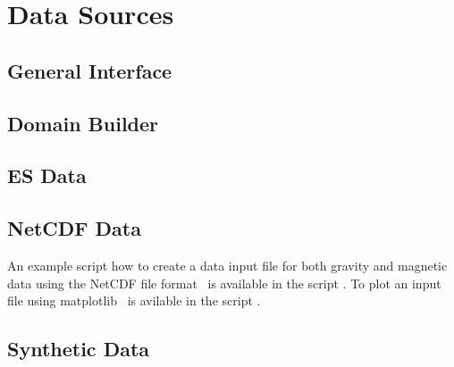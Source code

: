 \chapter{Data Sources}\label{Chp:ref:data sources}

\section{General Interface}

\section{Domain Builder}

\section{ES Data}

\section{NetCDF Data}
An example script how to create a data input file for both gravity and magnetic data using the NetCDF file format~\cite{NETCDF}
is available in the script . To plot an input file using matplotlib~\cite{MATPLTLIB} 
is avilable in the script .

\section{Synthetic Data}
